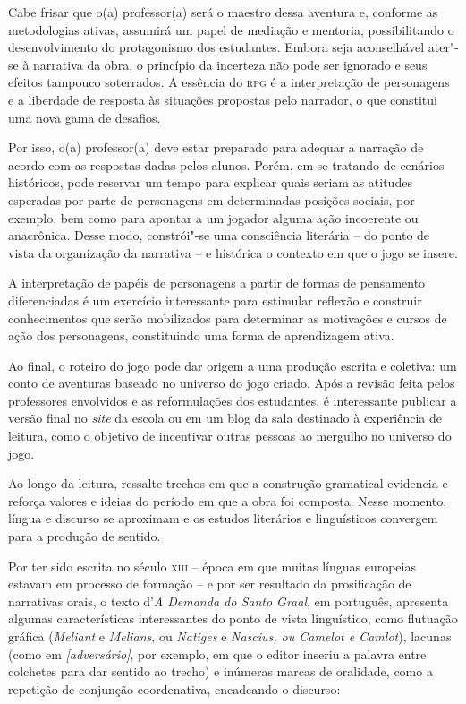 \documentclass{extarticle}
\begin{document}
Cabe frisar que o(a) professor(a) será o maestro dessa aventura e,
conforme as metodologias ativas, assumirá um papel de mediação e
mentoria, possibilitando o desenvolvimento do protagonismo dos
estudantes. Embora seja aconselhável ater"-se à narrativa da obra, o
princípio da incerteza não pode ser ignorado e seus efeitos tampouco
soterrados. A essência do \textsc{rpg} é a interpretação de personagens e a
liberdade de resposta às situações propostas pelo narrador, o que
constitui uma nova gama de desafios.

Por isso, o(a) professor(a) deve estar preparado para adequar a narração
de acordo com as respostas dadas pelos alunos. Porém, em se tratando de
cenários históricos, pode reservar um tempo para explicar quais seriam
as atitudes esperadas por parte de personagens em determinadas posições
sociais, por exemplo, bem como para apontar a um jogador alguma ação
incoerente ou anacrônica. Desse modo, constrói"-se uma consciência
literária -- do ponto de vista da organização da narrativa -- e
histórica o contexto em que o jogo se insere.

A interpretação de papéis de personagens a partir de formas de
pensamento diferenciadas é um exercício interessante para estimular
reflexão e construir conhecimentos que serão mobilizados para determinar
as motivações e cursos de ação dos personagens, constituindo uma forma
de aprendizagem ativa.

Ao final, o roteiro do jogo pode dar origem a uma produção escrita e
coletiva: um conto de aventuras baseado no universo do jogo criado. Após
a revisão feita pelos professores envolvidos e as reformulações dos
estudantes, é interessante publicar a versão final no \emph{site} da
escola ou em um blog da sala destinado à experiência de leitura, como o
objetivo de incentivar outras pessoas ao mergulho no universo do jogo.

Ao longo da leitura, ressalte trechos em que a construção
gramatical evidencia e reforça valores e ideias do período em que a obra
foi composta. Nesse momento, língua e discurso se aproximam e os estudos
literários e linguísticos convergem para a produção de sentido.

Por ter sido escrita no século \textsc{xiii} -- época em
que muitas línguas europeias estavam em processo de formação -- e por
ser resultado da prosificação de narrativas orais, o texto d'\emph{A
Demanda do Santo Graal}, em português, apresenta algumas características
interessantes do ponto de vista linguístico, como flutuação gráfica
(\emph{Meliant} e \emph{Melians}, ou \emph{Natiges} e \emph{Nascius, ou
Camelot e Camlot}), lacunas (como em \emph{{[}adversário{]}}, por
exemplo, em que o editor inseriu a palavra entre colchetes para dar
sentido ao trecho) e inúmeras marcas de oralidade, como a repetição de
conjunção coordenativa, encadeando o
discurso:
\end{document}
